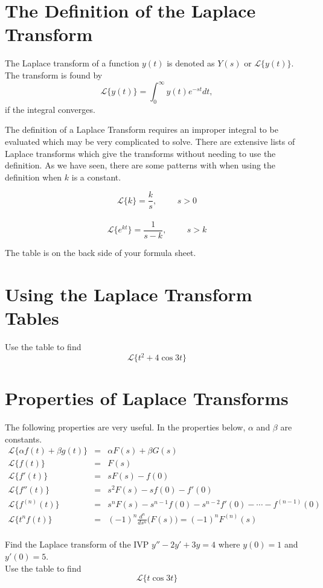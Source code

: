 \documentclass[12pt]{article}
\newcommand{\<}{\langle}
\renewcommand{\>}{\rangle}
\begin{document}
\vspace{2in}

 
\newpage

\section*{The Definition of the Laplace Transform}

\noindent The Laplace transform of a function $y(t)$ is denoted as $Y(s)$ or $\mathscr{L} \{y(t)\}$.  The transform is found by 
\[\mathscr{L} \{y(t)\} = \int^{\infty}_0 y(t)e^{-st}dt,\]  
if the integral converges.


The definition of a Laplace Transform requires an improper integral to be evaluated which may be very complicated to solve.   There are extensive lists of Laplace transforms which give the transforms without needing to use the definition.   As we have seen, there are some patterns with when using the definition when $k$ is a constant.

\[\mathscr{L} \{k\} = \frac{k}{s}, \hspace{1cm} s>0\]\\
\[\mathscr{L} \{e^{kt}\} = \frac{1}{s-k}, \hspace{1cm} s>k\]

The table is on the back side of your formula sheet.


\section*{Using the Laplace Transform Tables}

  Use the table to find \[ \mathscr{L} \{ t^2+4\cos{3t} \} \]


\newpage

\section*{Properties of Laplace Transforms}
\noindent The following properties are very useful.   In the properties below, $\alpha$ and $\beta$ are constants.\\
\begin{eqnarray*}
\mathscr{L} \{\alpha f(t) + \beta g(t)\} &=& \alpha F(s) + \beta G(s)\\
\mathscr{L} \{f(t)\} &=& F(s)\\
\mathscr{L} \{f'(t)\} &=& sF(s) - f(0)\\
\mathscr{L} \{f''(t)\} &=& s^2 F(s) - sf(0) - f'(0)\\
\mathscr{L} \{f^{(n)}(t)\} &=& s^n F(s) - s^{n-1}f(0) - s^{n-2}f'(0) - \cdots - f^{(n-1)}(0)\\
\mathscr{L} \{t^n f(t)\} &=& (-1)^n\frac{d^n}{ds^n}\big( F(s) \big) = (-1)^nF^{(n)}(s)\\
\end{eqnarray*}


  Find the Laplace transform of the IVP $y''-2y'+3y=4$ where $y(0)=1$ and $y'(0)=5$. \\
\vfill \vfill
{}  Use the table to find \[ \mathscr{L} \{ t\cos{3t} \} \] \\
\vfill


\end{document}
